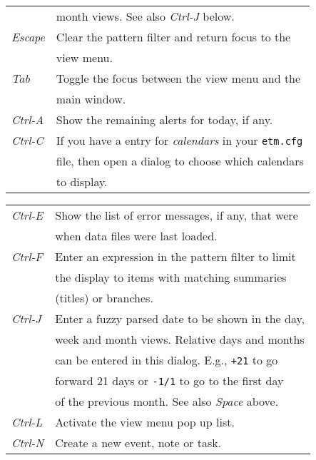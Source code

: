 \documentclass[9pt,landscape]{article}
\begin{document}
\begin{multicols}{3}
\begin{tabular}{@{}ll@{}}
                        & month views. See also \emph{Ctrl-J} below. \\
\emph{Escape}           & Clear the pattern filter and return focus to the \\
                        & view menu. \\
\emph{Tab}              & Toggle the focus between the view menu and the \\
                        & main window. \\
\emph{Ctrl-A}        & Show the remaining alerts for today, if any. \\
\emph{Ctrl-C}        & If you have a entry for \emph{calendars} in your   \verb!etm.cfg! \\
                        & file, then open a dialog to choose which calendars \\
                        & to display. \\
\end{tabular}
\begin{tabular}{@{}ll@{}}
\emph{Ctrl-E}        & Show the list of error messages, if any, that were \\
                        & when data files were last loaded.  \\
\emph{Ctrl-F}        & Enter an expression in the pattern filter to limit \\
                        & the display to items with matching summaries  \\
                        & (titles) or branches. \\
\emph{Ctrl-J}        & Enter a fuzzy parsed date to be shown in the day, \\
                        & week and month views. Relative days and months \\
                        & can be entered in this dialog. E.g., \verb'+21' to go \\
                        & forward 21 days or \verb'-1/1' to go to the first day \\
                        & of the previous month. See also \emph{Space} above. \\
\emph{Ctrl-L}        & Activate the view menu pop up list. \\
\emph{Ctrl-N}        & Create a new event, note or task. \\
\end{tabular}
\begin{tabular}{@{}ll@{}}


\end{tabular}
\end{multicols}
\end{document}
